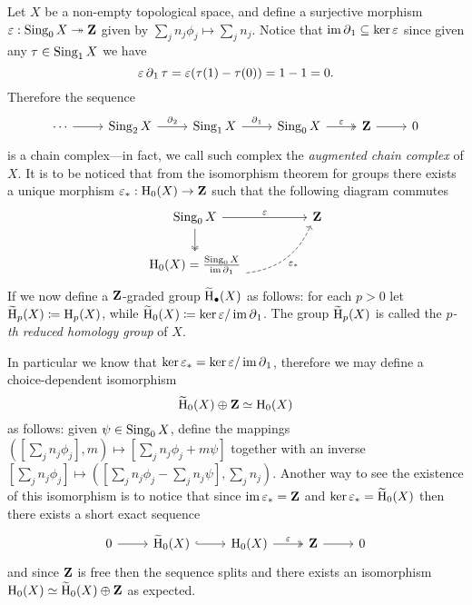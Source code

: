 \begin{definition}
\label{def:reduced-homology}
Let \(X\) be a non-empty topological space, and define a surjective morphism
\(\varepsilon: \operatorname{Sing}_0 X \twoheadrightarrow \mathbf{Z}\) given by
\(\sum_j n_j \phi_j \mapsto \sum_j n_j\). Notice that \(\operatorname{im} \operatorname{\partial}_1 \subseteq \ker \varepsilon\) since given any
\(\tau \in \operatorname{Sing}_1 X\) we have
\[
\varepsilon \operatorname{\partial}_1 \tau = \varepsilon(\tau(1) - \tau(0)) = 1 - 1 = 0.
\]
Therefore the sequence
\[
\begin{tikzcd}
\cdots \ar[r]
&\Sing_2 X \ar[r, "\face_2"]
&\Sing_1 X \ar[r, "\face_1"]
&\Sing_0 X \ar[r, two heads, "\varepsilon"]
&\Z
\ar[r]
&0
\end{tikzcd}
\]
is a chain complex---in fact, we call such complex the \emph{augmented chain
  complex} of \(X\). It is to be noticed that from the isomorphism theorem for
groups there exists a unique morphism \(\varepsilon_{*}: \operatorname{H}_0(X) \to \mathbf{Z}\) such that the
following diagram commutes
\[
\begin{tikzcd}
\Sing_0 X \ar[rr, "\varepsilon"] \ar[d, two heads]
&&\Z \\
\Hmlg_0(X) = \frac{\Sing_0 X}{\im \face_1}
\ar[rru, dashed, bend right, "\varepsilon_{*}"']
&&
\end{tikzcd}
\]
If we now define a \(\mathbf{Z}\)-graded group \(\operatorname{\widetilde{H}}_{\bullet}(X)\) as follows: for each
\(p > 0\) let \(\operatorname{\widetilde{H}}_p(X) \coloneq \operatorname{H}_p(X)\), while
\(\operatorname{\widetilde{H}}_0(X) \coloneq \ker \varepsilon/\operatorname{im} \operatorname{\partial}_1\). The group \(\operatorname{\widetilde{H}}_p(X)\) is called the
\emph{\(p\)-th reduced homology group} of \(X\).

In particular we know that
\(\ker \varepsilon_{*} = \ker \varepsilon/\operatorname{im} \operatorname{\partial}_1\), therefore we may define a choice-dependent
isomorphism
\[
\operatorname{\widetilde{H}}_0(X) \oplus \mathbf{Z} \simeq \operatorname{H}_0(X)
\]
as follows: given \(\psi \in \operatorname{Sing}_0 X\), define the mappings
\(([\sum_j n_j \phi_j], m) \mapsto [\sum_j n_j \phi_j + m \psi]\) together with an inverse
\([\sum_j n_j \phi_j] \mapsto ([\sum_j n_j \phi_j - \sum_j n_j \psi], \sum_j n_j)\). Another way to see the
existence of this isomorphism is to notice that since \(\operatorname{im} \varepsilon_{*} = \mathbf{Z}\) and
\(\ker \varepsilon_{*} = \operatorname{\widetilde{H}}_0(X)\) then there exists a short exact sequence
\[
\begin{tikzcd}
0 \ar[r]
&\rHmlg_0(X) \ar[r, hook]
&\Hmlg_0(X) \ar[r, two heads, "\varepsilon"]
&\Z \ar[r]
&0
\end{tikzcd}
\]
and since \(\mathbf{Z}\) is free then the sequence splits and there exists an
isomorphism \(\operatorname{H}_0(X) \simeq \operatorname{\widetilde{H}}_0(X) \oplus \mathbf{Z}\) as expected.
\end{definition}

